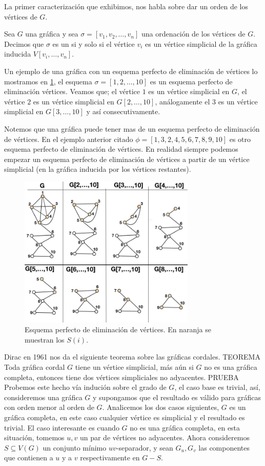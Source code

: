 La primer caracterización que exhibimos, nos habla sobre dar un orden de los
vértices de $G$.

Sea $G$ una gráfica y sea $\sigma= [v_1,v_2, \dots, v_n]$ una ordenación de los
vértices de $G$. Decimos que $\sigma$ es un  si y solo si el vértice $v_i$ es un vértice simplicial
de la gráfica inducida $V[v_{i}, \dots , v_n]$.

Un ejemplo de una gráfica con un esquema perfecto de eliminación de vértices lo
mostramos en \cref{fig:16}, el esquema $\sigma=[1,2,\dots, 10]$ es un esquema
perfecto de eliminación vértices. Veamos que; el vértice $1$ es un vértice
simplicial en $G$, el vértice $2$ es un vértice simplicial en $G[2, \dots, 10]$,
análogamente el $3$ es un vértice simplicial en $G[3, \dots, 10]$ y así
consecutivamente. 

Notemos que una gráfica puede tener mas de un esquema perfecto de eliminación de
vértices. En el ejemplo anterior citado $\phi = [1,3,2,4,5,6,7,8,9,10]$ es otro
esquema perfecto de eliminación de vértices. En realidad siempre podemos empezar
un esquema perfecto de eliminación de vértices a partir de un vértice simplicial
(en la gráfica inducida por los vértices restantes).

\begin{figure}[H]
  \centering
  \includegraphics[width=0.75\textwidth]{recursos/capturas/19.jpg}
  \caption{Esquema perfecto de eliminación de vértices. En naranja se muestran los $S(i)$.}
  \label{fig:16}
\end{figure}

Dirac en 1961 nos da el siguiente teorema sobre las gráficas cordales. 
TEOREMA Toda gráfica cordal $G$ tiene un vértice simplicial, más aún si $G$ no es una gráfica completa, entonces tiene dos vértices simpliciales no adyacentes.
PRUEBA Probemos este hecho vía indución sobre el grado de $G$, el caso base es trivial, así, consideremos una gráfica $G$ y supongamos que el resultado es válido para gráficas con orden menor al orden de $G$. Analicemos los dos casos siguientes, $G$ es un gráfica completa, en este caso cualquier vértice es simplicial y el resultado es trivial. El caso interesante es cuando $G$ no es una gráfica completa, en esta situación, tomemos $u,v$ un par de vértices no adyacentes. Ahora consideremos $S\subseteq V(G)$ un conjunto mínimo $uv$-separador, y sean $G_u, G_v$ las componentes que contienen a $u$ y a $v$ respectivamente en $G-S$. 

